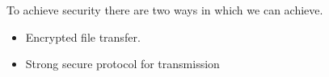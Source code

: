 \documentclass[conference]{IEEEtran}
\begin{document}
%
%


%





To achieve security there are two ways in which we can achieve.
\begin{itemize}
	\item Encrypted file transfer.
	\item Strong secure protocol for transmission
\end{itemize}
\end{document}

